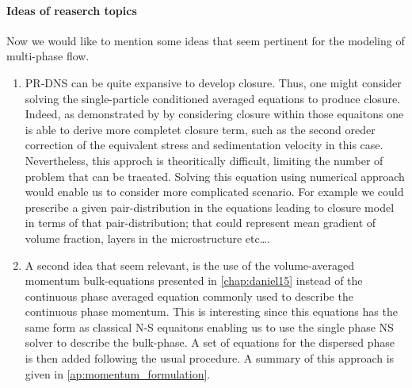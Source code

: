 \paragraph*{Ideas of reaserch topics}
Now we would like to mention some ideas that seem pertinent for the modeling of multi-phase flow. 
\begin{enumerate}
    \item PR-DNS can be quite expansive to develop closure. 
    Thus, one might consider solving the single-particle conditioned averaged equations to produce closure.  
    Indeed, as demonstrated by \citet{hinch1977averaged} by considering closure within those equaitons one is able to derive more completet closure term, such as the second oreder correction of the equivalent stress and sedimentation velocity in this case. 
    Nevertheless, this approch is theoritically difficult, limiting the number of problem that can be traeated. 
    Solving this equation using numerical approach would enable us to consider more complicated scenario. 
    For example we could prescribe a given pair-distribution in the equations leading to closure model in terms of that pair-distribution; that could represent mean gradient of volume fraction, layers in the microstructure etc\ldots. 
    \item A second idea that seem relevant, is the use of the volume-averaged momentum bulk-equations presented in \ref{chap:daniel15} instead of the continuous phase averaged equation commonly used to describe the continuous phase momentum.
    This is interesting since this equations has the same form as classical N-S equaitons enabling us to use the single phase NS solver to describe the bulk-phase. 
    A set of equations for the dispersed phase is then added following the usual procedure. 
    A summary of this approach is given in \ref{ap:momentum_formulation}. 
\end{enumerate}

